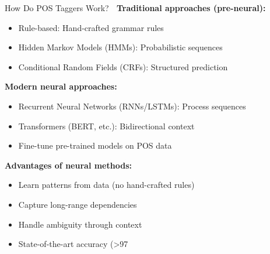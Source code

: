 \documentclass[aspectratio=169]{beamer}
\begin{document}
\begin{frame}[shrink=10]{How Do POS Taggers Work? 🧠}
    \textbf{Traditional approaches (pre-neural):}
    \begin{itemize}\setlength{\itemsep}{0pt}
        \item Rule-based: Hand-crafted grammar rules
        \item Hidden Markov Models (HMMs): Probabilistic sequences
        \item Conditional Random Fields (CRFs): Structured prediction
    \end{itemize}

    \vspace{0.5em}
    \textbf{Modern neural approaches:}
    \begin{itemize}\setlength{\itemsep}{0pt}
        \item Recurrent Neural Networks (RNNs/LSTMs): Process sequences
        \item Transformers (BERT, etc.): Bidirectional context
        \item Fine-tune pre-trained models on POS data
    \end{itemize}

    \vspace{0.5em}
    \textbf{Advantages of neural methods:}
    \begin{itemize}\setlength{\itemsep}{0pt}
        \item Learn patterns from data (no hand-crafted rules)
        \item Capture long-range dependencies
        \item Handle ambiguity through context
        \item State-of-the-art accuracy (>97%
    \end{itemize}
\end{frame}
\end{document}
